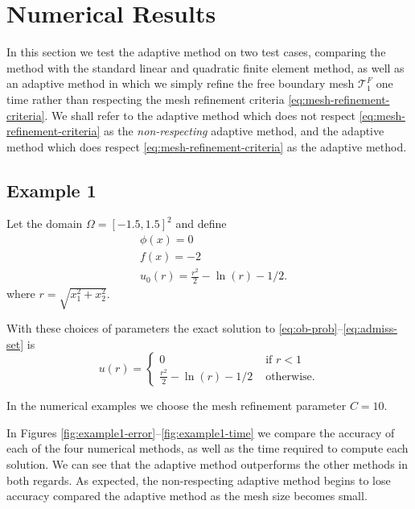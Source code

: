 \documentclass{article}
\newcommand{\T}{\mathcal{T}}
\begin{document}
\begin{enumerate}
\end{enumerate}

\section{Numerical Results}
In this section we test the adaptive method on two test cases,
comparing the method with the standard linear and quadratic finite
element method, as well as an adaptive method in which we simply
refine the free boundary mesh $\T_1^F$ one time rather than respecting
the mesh refinement criteria \eqref{eq:mesh-refinement-criteria}.  We
shall refer to the adaptive method which does not respect
\eqref{eq:mesh-refinement-criteria} as the \textit{non-respecting}
adaptive method, and the adaptive method which does respect
\eqref{eq:mesh-refinement-criteria} as the adaptive method. 

\subsection{Example 1}
Let the domain $\Omega=[-1.5,1.5]^2$ and define 
\begin{align}
  &\phi(x)=0 \label{ex1-phi}\\
  &f(x)=-2\label{ex1-f}\\
  &u_0(r)=\frac{r^2}{2}-\ln(r)-1/2 \label{ex1-u0}.
\end{align}
where $r=\sqrt{x_1^2+x_2^2}$.

With these choices of parameters the exact solution to
\eqref{eq:ob-prob}--\eqref{eq:admiss-set} is
\begin{equation}
  \label{eq:ex1-u}
u(r)=  \begin{cases}
  0 &\text{ if } r<1\\
  \frac{r^2}{2}-\ln(r)-1/2 & \text{ otherwise.}
\end{cases}
\end{equation}

In the numerical examples we choose the mesh refinement parameter $C=10$.  

In Figures \ref{fig:example1-error}--\ref{fig:example1-time} we compare the
accuracy of each of the four numerical methods, as well as the time
required to compute each solution.  We can see that the adaptive
method outperforms the other methods in both regards.  As expected,
the non-respecting adaptive method  begins to lose accuracy compared
the adaptive method as the mesh size becomes small. 
\end{document}
